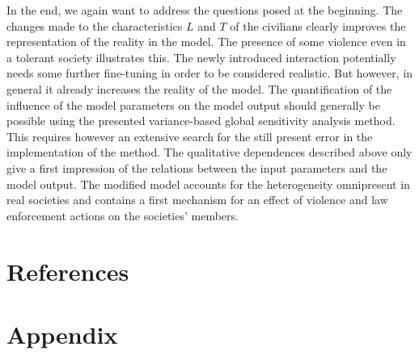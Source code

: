 \documentclass[11pt]{article}
\begin{document}
In the end, we again want to address the questions posed at the beginning. The changes made to the characteristics $L$ and $T$ of the civilians clearly improves the representation of the reality in the model. The presence of some violence even in a tolerant society illustrates this. The newly introduced interaction potentially needs some further fine-tuning in order to be considered realistic. But however, in general it already increases the reality of the model. The quantification of the influence of the model parameters on the model output should generally be possible using the presented variance-based global sensitivity analysis method. This requires however an extensive search for the still present error in the implementation of the method. The qualitative dependences described above only give a first impression of the relations between the input parameters and the model output. The modified model accounts for the heterogeneity omnipresent in real societies and contains a first mechanism for an effect of violence and law enforcement actions on the societies' members.

\section{References}

{}


\newpage

\section{Appendix}
\end{document}
